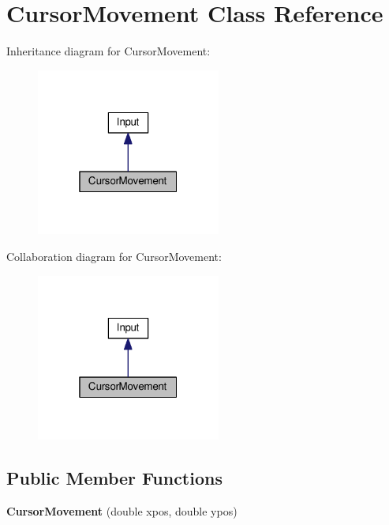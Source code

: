 \hypertarget{classCursorMovement}{}\section{Cursor\+Movement Class Reference}
\label{classCursorMovement}


Inheritance diagram for Cursor\+Movement\+:
\nopagebreak
\begin{figure}[H]
\begin{center}
\leavevmode
\includegraphics[width=172pt]{classCursorMovement__inherit__graph}
\end{center}
\end{figure}


Collaboration diagram for Cursor\+Movement\+:
\nopagebreak
\begin{figure}[H]
\begin{center}
\leavevmode
\includegraphics[width=172pt]{classCursorMovement__coll__graph}
\end{center}
\end{figure}
\subsection*{Public Member Functions}
\begin{DoxyCompactItemize}
\item 
{\bfseries Cursor\+Movement} (double xpos, double ypos)\hypertarget{classCursorMovement_a5d4ae67fcfe792baff996121b694e7c3}{}\label{classCursorMovement_a5d4ae67fcfe792baff996121b694e7c3}

\end{DoxyCompactItemize}
